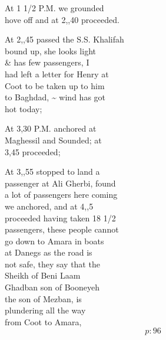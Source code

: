 \documentclass{report}
\begin{document}



	\par{
 	At 1 1/2 P.M. we grounded\ \\hove off and at 2,,40 proceeded.\ \\
	}

	\par{
 	At 2,,45 passed the S.S. Khalifah\ \\bound up, she looks light\ \\\& has few passengers, I\ \\had left a letter for Henry at\ \\Coot to be taken up to him\ \\to Baghdad, \~{} wind has got\ \\hot today;\ \\
	}

	\par{
 	At 3,30 P.M. anchored at\ \\Maghessil and Sounded; at\ \\3,45 proceeded;\ \\
	}

	\par{
 	At 3,,55 stopped to land a\ \\passenger at Ali Gherbi, found\ \\a lot of passengers here coming\ \\we anchored, and at 4,,5\ \\proceeded having taken 18 1/2\ \\passengers, these people cannot\ \\go down to Amara in boats\ \\at Danegs as the road is\ \\not safe, they say that the\ \\Sheikh of Beni Laam\ \\Ghadban son of Booneyeh\ \\the son of Mezban, is\ \\plundering all the way\ \\from Coot to Amara,\ \\
  \[p: 96 \]

	}

\end{document}
